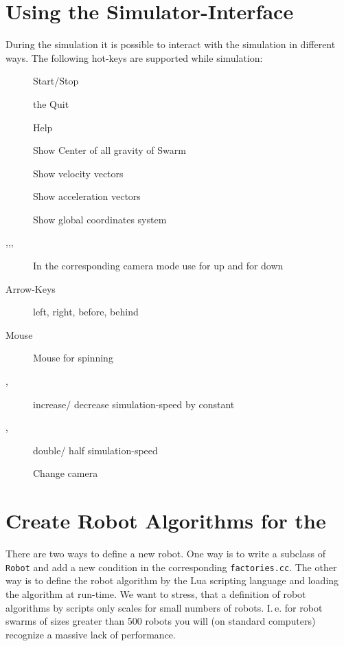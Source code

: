 \documentclass[a4paper,halfparskip,11pt,twoside]{scrartcl}
\begin{document}
\section{Using the Simulator-Interface}
During the simulation it is possible to interact with the simulation in different ways. The following hot-keys are supported while simulation:

\begin{description}
	\item [] Start/Stop
	\item [] the Quit \RSS\
	\item [] Help
	\item [] Show Center of all gravity of Swarm
	\item [] Show velocity vectors
	\item [] Show acceleration vectors
	\item [] Show global coordinates system
	\item [,,,] In the corresponding camera mode use  for up  and  for down %
	\item [Arrow-Keys] left, right, before, behind
	\item [Mouse] Mouse for spinning
	\item [\fbox{\tt +}, \fbox{\tt -}] increase/ decrease simulation-speed by constant
	\item [\fbox{\tt *},\fbox{\tt /}] double/ half simulation-speed
	\item [] Change camera
\end{description}

\section{Create Robot Algorithms for the \RSS}
There are two ways to define a new robot. One way is to write a subclass of \texttt{Robot} and add a new condition in the corresponding \texttt{factories.cc}. The other way is to define the robot algorithm by the {\sffamily Lua} scripting language and loading the algorithm at run-time. We want to stress, that a definition of robot algorithms by \Lua scripts only scales for small numbers of robots. I.\,e. for robot swarms of sizes greater than 500 robots you will (on standard computers) recognize a massive lack of performance.
\end{document}
